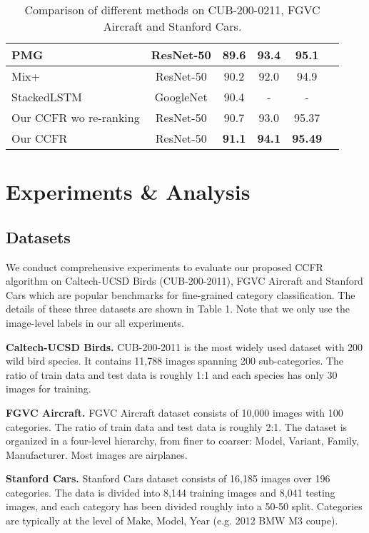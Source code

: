 \documentclass[10pt,twocolumn,letterpaper]{article}
\begin{document}
\begin{table*}
\begin{center}
\begin{tabular}{|l|c|c|c|c|c|}
\hline
PMG\cite{du2020fine} & ResNet-50  & 89.6 & 93.4 & 95.1  \\
\hline
Mix+\cite{abs-2004-02684} & ResNet-50  & 90.2 & 92.0 & 94.9 \\
\hline
StackedLSTM\cite{GeLY19}& GoogleNet &   90.4 & - & -\\
\hline
\hline
Our CCFR wo re-ranking & ResNet-50 & 90.7 & 93.0 & 95.37 \\
\hline
Our CCFR & ResNet-50  & \textbf{91.1} & \textbf{94.1} & \textbf{95.49} \\
\hline
\end{tabular}
\end{center}
\caption{Comparison of different methods on CUB-200-0211, FGVC Aircraft and Stanford Cars.}
\end{table*}







\section{Experiments \& Analysis}
\subsection{Datasets}
We conduct comprehensive experiments to evaluate our proposed CCFR algorithm on Caltech-UCSD Birds (CUB-200-2011\cite{wah2011caltech}), FGVC Aircraft\cite{maji2013fine} and Stanford Cars\cite{krause20133d} which are popular benchmarks for fine-grained category classification. The details of these three datasets are shown in Table 1. Note that we only use the image-level labels in our all experiments.

\noindent
\textbf{Caltech-UCSD Birds.}
CUB-200-2011 is the most widely used dataset with 200 wild bird species. It contains 11,788 images spanning 200 sub-categories. The ratio of train data and test data is roughly 1:1 and each species has only 30 images for training.

\noindent
\textbf{FGVC Aircraft.}
FGVC Aircraft dataset consists of 10,000 images with 100 categories. The ratio of train data and test data is roughly 2:1. The dataset is organized in a four-level hierarchy, from finer to coarser: Model, Variant, Family, Manufacturer. Most images are airplanes.

\noindent
\textbf{Stanford Cars.}
Stanford Cars dataset consists of 16,185 images over 196 categories. The data is divided into 8,144 training images and 8,041 testing images, and each category has been divided roughly into a 50-50 split. Categories are typically at the level of Make, Model, Year (e.g. 2012 BMW M3 coupe).
\end{document}
